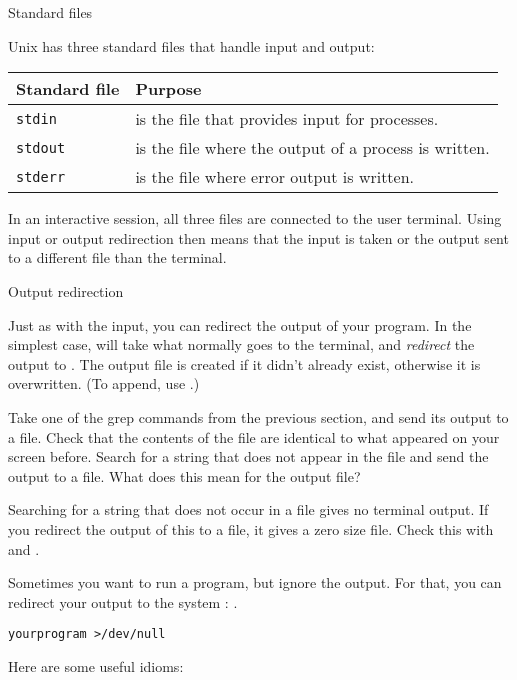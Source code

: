  {Standard files}

Unix has three standard files that handle input and output:

\begin{tabular}{ll}
  \toprule
  Standard file&Purpose\\
  \midrule
  \texttt{stdin}& is the file that provides input for processes.\\
  \texttt{stdout}& is the file where the output of a process is  written.\\
  \texttt{stderr}& is the file where error output is written.\\
  \bottomrule
\end{tabular}

In an interactive session, all three files are connected to the user
terminal. Using input or output redirection then means that the input
is taken or the output sent to a different file than the terminal.

 {Output redirection}

Just as with the input, you can redirect the output of your program.
In the simplest case,
will take what
normally goes to the terminal, and \emph{redirect}
the output to . The output
file is created if it didn't already exist, otherwise it is
overwritten. (To append, use .)

\begin{exercise}
  Take one of the grep commands from the previous section, and send
  its output to a file. Check that the contents of the file are
  identical to what appeared on your screen before. Search for a
  string that does not appear in the file and send the output to a
  file. What does this mean for the output file?
\end{exercise}
\begin{outcome}
  Searching for a string that does not occur in a file gives no
  terminal output. If you redirect the output of this  to a
  file, it gives a zero size file. Check this with  and .
\end{outcome}

Sometimes you want to run a program, but ignore the output.
For that, you can redirect your output to the system
: .
\begin{verbatim}
yourprogram >/dev/null
\end{verbatim}
Here are some useful idioms:


